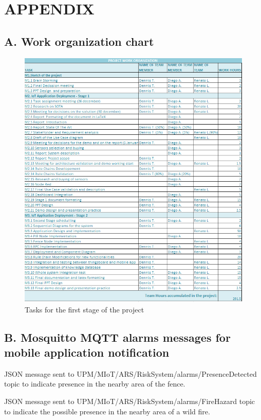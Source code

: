 \section{APPENDIX}
\subsection*{A. Work organization chart}
\begin{figure}[H]
    \centering
    \includegraphics[width=1\textwidth]{./images/Tasks.png}
    \caption{Tasks for the first stage of the project}
    \label{fig:tasks}
\end{figure}

\clearpage
\subsection*{B. Mosquitto MQTT alarms messages for mobile application notification}
JSON message sent to UPM/MIoT/ARS/RiskSystem/alarms/PresenceDetected topic to indicate presence in the nearby area of the fence.


JSON message sent to UPM/MIoT/ARS/RiskSystem/alarms/FireHazard topic to indicate the possible presence in the nearby area of a wild fire.


